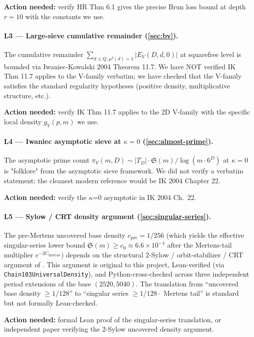 \documentclass[11pt,a4paper]{article}
\theoremstyle{plain}
\theoremstyle{definition}
\theoremstyle{remark}
\begin{document}
\textbf{Action needed:} verify HR Thm 6.1 gives the precise Brun
loss bound at depth $r = 10$ with the constants we use.

\paragraph{L3 --- Large-sieve cumulative remainder (\cref{sec:bv}).}
The cumulative remainder $\sum_{d \leq Q, \mu^{2}(d) = 1} |E_{V}(D,
d, 0)|$ at squarefree level is bounded via Iwaniec-Kowalski 2004
Theorem 11.7. We have NOT verified IK Thm 11.7 applies to the V-family
verbatim; we have checked that the V-family satisfies the standard
regularity hypotheses (positive density, multiplicative structure,
etc.).

\textbf{Action needed:} verify IK Thm 11.7 applies to the 2D V-family
with the specific local density $g_{V}(p, m)$ we use.

\paragraph{L4 --- Iwaniec asymptotic sieve at $\kappa = 0$
(\cref{sec:almost-prime}).}
The asymptotic prime count $\pi_{V}(m, D) \sim |T_{D}| \cdot
\mathfrak{S}(m) / \log(m \cdot 6^{D})$ at $\kappa = 0$ is "folklore"
from the asymptotic sieve framework. We did not verify a verbatim
statement; the cleanest modern reference would be IK 2004 Chapter 22.

\textbf{Action needed:} verify the $\kappa$=0 asymptotic in IK 2004 Ch.~22.

\paragraph{L5 --- Sylow / CRT density argument
(\cref{sec:singular-series}).}
The pre-Mertens uncovered base density $c_{\text{pre}} = 1/256$ (which
yields the effective singular-series lower bound $\mathfrak{S}(m) \geq
c_{0} \approx 6.6 \times 10^{-4}$ after the Mertens-tail multiplier
$e^{-2 C_{\text{Mertens}}}$) depends on the
structural 2-Sylow / orbit-stabilizer / CRT argument of
\cite{WilderChain103}. This argument is original to this project,
Lean-verified (via \texttt{Chain103UniversalDensity}), and
Python-cross-checked across three independent period extensions of
the base $(2520, 5040)$. The translation from ``uncovered base
density $\geq 1/128$'' to ``singular series $\geq 1/128 \cdot$
Mertens tail'' is standard but not formally Lean-checked.

\textbf{Action needed:} formal Lean proof of the singular-series
translation, or independent paper verifying the 2-Sylow uncovered
density argument.
\end{document}
